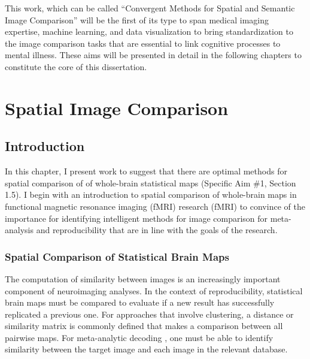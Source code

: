 \documentclass{report}
\begin{document}
This work, which can be called ``Convergent Methods for Spatial and Semantic Image Comparison'' will be the first of its type to span
medical imaging expertise, machine learning, and data visualization to bring standardization to the image comparison tasks that are essential to link cognitive processes to mental illness. These aims will be presented in detail in
the following chapters to constitute the core of this dissertation.

\chapter{Spatial Image Comparison}

\section{Introduction}

In this chapter, I present work
 \cite{Sochat2015-qs} to suggest that there are optimal methods for spatial comparison of of whole-brain statistical maps (Specific Aim \#1, Section 1.5). I begin with an introduction to spatial comparison of whole-brain maps in
functional magnetic resonance imaging (fMRI) research (fMRI) to convince
of the importance for identifying intelligent methods for image
comparison for meta-analysis and reproducibility that are in line with
the goals of the research.

\subsection{Spatial Comparison of Statistical Brain Maps}

The computation of similarity between images is an increasingly
important component of neuroimaging analyses. In the context of
reproducibility, statistical brain maps must be compared to evaluate if
a new result has successfully replicated a previous one. For approaches
that involve clustering, a distance or similarity matrix is commonly
defined that makes a comparison between all pairwise maps. For
meta-analytic decoding \cite{Yarkoni2011-rg}, one must be able to identify similarity between the target image and
each image in the relevant database.
\end{document}
